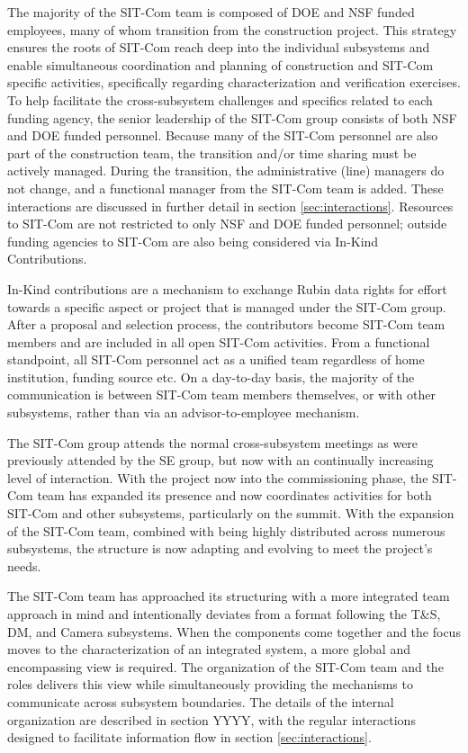\documentclass[SE,lsstdraft,authoryear,toc]{lsstdoc}
\begin{document}
The majority of the SIT-Com team is composed of DOE and NSF funded employees, many of whom transition from the construction project.
This strategy ensures the roots of SIT-Com reach deep into the individual subsystems and enable simultaneous coordination and planning of construction and SIT-Com specific activities, specifically regarding characterization and verification exercises.
To help facilitate the cross-subsystem challenges and specifics related to each funding agency, the senior leadership of the SIT-Com group consists of both NSF and DOE funded personnel.
Because many of the SIT-Com personnel are also part of the construction team, the transition and/or time sharing must be actively managed.
During the transition, the administrative (line) managers do not change, and a functional manager from the SIT-Com team is added.
These interactions are discussed in further detail in section \ref{sec:interactions}.
Resources to SIT-Com are not restricted to only NSF and DOE funded personnel; outside funding agencies to SIT-Com are also being considered via In-Kind Contributions.

 In-Kind contributions are a mechanism to exchange Rubin data rights for effort towards a specific aspect or project that is managed under the SIT-Com group.
After a proposal and selection process, the contributors become SIT-Com team members and are included in all open SIT-Com activities.
From a functional standpoint, all SIT-Com personnel act as a unified team regardless of home institution, funding source etc.
On a day-to-day basis, the majority of the communication is between SIT-Com team members themselves, or with other subsystems, rather than via an advisor-to-employee mechanism.

The SIT-Com group attends the normal cross-subsystem meetings as were previously attended by the SE group, but now with an continually increasing level of interaction.
With the project now into the commissioning phase, the SIT-Com team has expanded its presence and now coordinates activities for both SIT-Com and other subsystems, particularly on the summit.
With the expansion of the SIT-Com team, combined with being highly distributed across numerous subsystems, the structure is now adapting and evolving to meet the project's needs.

The SIT-Com team has approached its structuring with a more integrated team approach in mind and intentionally deviates from a format following the T\&S, DM, and Camera subsystems.
When the components come together and the focus moves to the characterization of an integrated system, a more global and encompassing view is required.
The organization of the SIT-Com team and the roles delivers this view while simultaneously providing the mechanisms to communicate across subsystem boundaries.
The details of the internal organization are described in section YYYY, with the regular interactions designed to facilitate information flow in section \ref{sec:interactions}.
\end{document}
